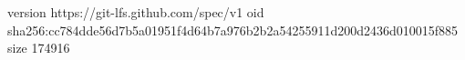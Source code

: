 version https://git-lfs.github.com/spec/v1
oid sha256:cc784dde56d7b5a01951f4d64b7a976b2b2a54255911d200d2436d010015f885
size 174916
